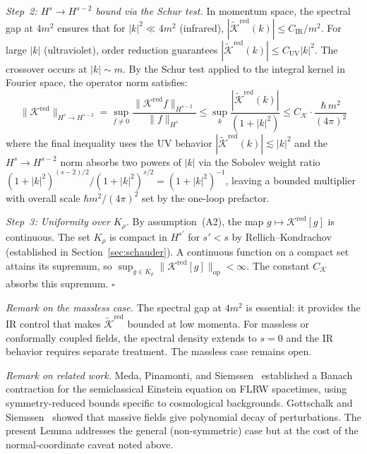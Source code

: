 \documentclass[12pt,a4paper]{article}
\begin{document}
\smallskip\noindent\textit{Step~2: $H^s \to H^{s-2}$ bound via the Schur test.}
In momentum space, the spectral gap at $4m^2$ ensures that for $|k|^2 \ll 4m^2$
(infrared), $|\tilde{\mathcal{K}}^{\mathrm{red}}(k)| \leq C_{\mathrm{IR}}/m^2$.
For large $|k|$ (ultraviolet), order reduction guarantees
$|\tilde{\mathcal{K}}^{\mathrm{red}}(k)| \leq C_{\mathrm{UV}} |k|^2$.
The crossover occurs at $|k| \sim m$. By the Schur test applied to the integral kernel
in Fourier space, the operator norm satisfies:
\begin{equation}
\bigl\|\mathcal{K}^{\mathrm{red}}\bigr\|_{H^s \to H^{s-2}}
= \sup_{f \neq 0} \frac{\|\mathcal{K}^{\mathrm{red}} f\|_{H^{s-2}}}{\|f\|_{H^s}}
\leq \sup_k \frac{|\tilde{\mathcal{K}}^{\mathrm{red}}(k)|}{(1+|k|^2)}
\leq C_{\mathcal{K}} \cdot \frac{\hbar\, m^2}{(4\pi)^2}
\label{eq:schur_bound}
\end{equation}
where the final inequality uses the UV behavior
$|\tilde{\mathcal{K}}^{\mathrm{red}}(k)| \lesssim |k|^2$ and the $H^s \to H^{s-2}$
norm absorbs two powers of $|k|$ via the Sobolev weight ratio
$(1+|k|^2)^{(s-2)/2}/(1+|k|^2)^{s/2} = (1+|k|^2)^{-1}$, leaving a bounded multiplier
with overall scale $\hbar m^2/(4\pi)^2$ set by the one-loop prefactor.

\smallskip\noindent\textit{Step~3: Uniformity over $K_\rho$.}
By assumption~(A2), the map $g \mapsto \mathcal{K}^{\mathrm{red}}[g]$ is continuous.
The set $K_\rho$ is compact in $H^{s'}$ for $s' < s$ by Rellich--Kondrachov
(established in Section~\ref{sec:schauder}). A continuous function on a compact set
attains its supremum, so
$\sup_{g \in K_\rho}\|\mathcal{K}^{\mathrm{red}}[g]\|_{\mathrm{op}} < \infty$.
The constant $C_{\mathcal{K}}$ absorbs this supremum. \hfill$\square$

\smallskip\noindent\textit{Remark on the massless case.} The spectral gap at $4m^2$ is
essential: it provides the IR control that makes $\tilde{\mathcal{K}}^{\mathrm{red}}$
bounded at low momenta. For massless or conformally coupled fields, the spectral density
extends to $s = 0$ and the IR behavior requires separate treatment. The massless case
remains open.

\smallskip\noindent\textit{Remark on related work.} Meda, Pinamonti, and
Siemssen~\cite{meda_pinamonti_siemssen} established a Banach contraction for the
semiclassical Einstein equation on FLRW spacetimes, using symmetry-reduced bounds
specific to cosmological backgrounds. Gottschalk and Siemssen~\cite{gottschalk_siemssen}
showed that massive fields give polynomial decay of perturbations. The present Lemma
addresses the general (non-symmetric) case but at the cost of the
normal-coordinate caveat noted above.
\end{document}

